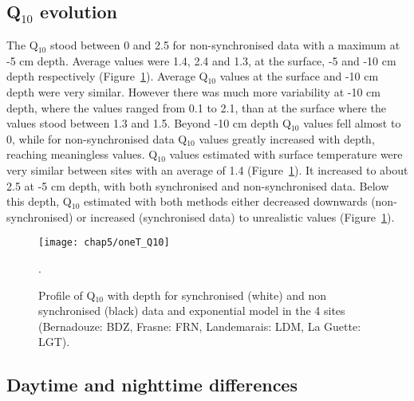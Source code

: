 \subsection{Q$_{10}$ evolution}

The Q$_{10}$ stood between 0 and 2.5 for non-synchronised data with a maximum at -5 cm depth.
Average values were 1.4, 2.4 and 1.3, at the surface, -5 and -10 cm depth respectively (Figure~\ref{fig:oneT_Q10}).
Average Q$_{10}$ values at the surface and -10 cm depth were very similar.
However there was much more variability at -10 cm depth, where the values ranged from 0.1 to 2.1, than at the surface where the values stood between 1.3 and 1.5.
Beyond -10 cm depth Q$_{10}$ values fell almost to 0, while for non-synchronised data Q$_{10}$ values greatly increased with depth, reaching meaningless values.
Q$_{10}$ values estimated with surface temperature were very similar between sites with an average of 1.4 (Figure~\ref{fig:oneT_Q10}).
It increased to about 2.5 at -5 cm depth, with both synchronised and non-synchronised data.
Below this depth, Q$_{10}$ estimated with both methods either decreased downwards (non-synchronised) or increased (synchronised data) to unrealistic values (Figure~\ref{fig:oneT_Q10}).

\begin{figure}
\centering
\texttt{[image: chap5/oneT\_Q10]}
\caption{Profile of Q$_{10}$ with depth for synchronised (white) and non synchronised (black) data and exponential model in the 4 sites (Bernadouze: BDZ, Frasne: FRN, Landemarais: LDM, La Guette: LGT).}.
\label{fig:oneT_Q10}
\end{figure}

\subsection{Daytime and nighttime differences}


